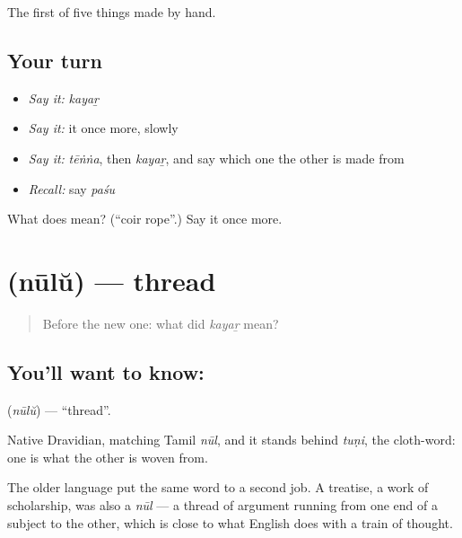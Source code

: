\begin{grammarlens}[title={What you've built}]
The first of five things made by hand.
\end{grammarlens}

\subsection*{Your turn}
\begin{itemize}
\raggedright
  \item \emph{Say it:} \emph{kayaṟ}
  \item \emph{Say it:} it once more, slowly
  \item \emph{Say it:} \emph{tēṅṅa}, then \emph{kayaṟ}, and say which one the other is made from
  \item \emph{Recall:} say \emph{paśu}
\end{itemize}

\begin{tcolorbox}[breakable,colback=teal!4,colframe=teal!35!black,title={Before you move on}]
What does  mean? (\textquotedblleft{}coir rope\textquotedblright{}.) Say it once more.
\end{tcolorbox}
\section[\texorpdfstring{\ml{നൂല്} (nūlŭ)}{നൂല് (nūlŭ)}]{ (nūlŭ) — thread}

\label{lesson:ML-C62-thread}



\begin{quote}
Before the new one: what did \emph{kayaṟ} mean?
\end{quote}

\subsection*{You'll want to know: }
\textbf{} (\emph{nūlŭ}) — \textquotedblleft{}thread\textquotedblright{}.

Native Dravidian, matching Tamil \emph{nūl}, and it stands behind \emph{tuṇi}, the cloth-word: one is what the other is woven from.

The older language put the same word to a second job. A treatise, a work of scholarship, was also a \emph{nūl} — a thread of argument running from one end of a subject to the other, which is close to what English does with a train of thought.

